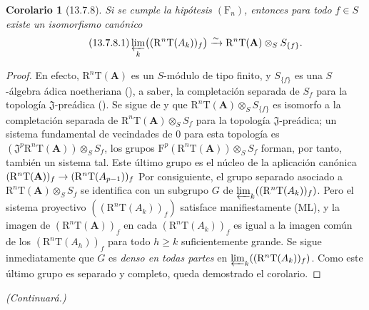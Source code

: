 \documentclass[10pt,oneside,openany]{book}
\theoremstyle{egaenv}\newtheorem*{env}{---}
\theoremstyle{egastatement}
\newtheorem*{corollary}{Corolario}
\theoremstyle{egadescription}
\renewcommand{\geq}{\geqslant}
\renewcommand{\to}{\mathchoice{\longrightarrow}{\rightarrow}{\rightarrow}{\rightarrow}}
\begin{document}
\begin{corollary}[13.7.8]
\label{0.13.7.8}
\label{0.13.7.8-fr}
Si se cumple la hipótesis $(\mathrm F_n)$, entonces para todo $f\in S$
existe un isomorfismo canónico
\begin{equation}
\label{0.13.7.8.1-fr}
\tag{13.7.8.1}
\varprojlim_k\bigl((\mathrm R^n\mathrm T(A_k))_f\bigr)
\xrightarrow{\sim}\mathrm R^n\mathrm T(\mathbf A)\otimes_S S_{\{f\}}.
\end{equation}
\end{corollary}

\begin{proof}
En efecto, $\mathrm R^n\mathrm T(\mathbf A)$ es un $S$-módulo de tipo finito,
y $S_{\{f\}}$ es una $S$-álgebra ádica noetheriana
(), a saber, la completación separada
de $S_f$ para la topología $\mathfrak J$-preádica
().
Se sigue de  y
 que
$\mathrm R^n\mathrm T(\mathbf A)\otimes_S S_{\{f\}}$
es isomorfo a la completación separada de
$\mathrm R^n\mathrm T(\mathbf A)\otimes_S S_f$ para la
topología $\mathfrak J$-preádica; un sistema fundamental de vecindades de $0$ para esta topología es
$(\mathfrak J^p\mathrm R^n\mathrm T(\mathbf A))\otimes_S S_f$,
los grupos
$\mathrm F^p(\mathrm R^n\mathrm T(\mathbf A))\otimes_S S_f$
forman, por tanto, también un sistema tal.
Este último grupo es el núcleo de la aplicación canónica
$(\mathrm R^n\mathrm T(\mathbf A))_f\to
(\mathrm R^n\mathrm T(A_{p-1}))_f$
Por consiguiente, el grupo separado asociado a
$\mathrm R^n\mathrm T(\mathbf A)\otimes_S S_f$ se identifica con un subgrupo
$G$ de
$\varprojlim_k((\mathrm R^n\mathrm T(A_k))_f)$.
Pero el sistema proyectivo
$((\mathrm R^n\mathrm T(A_k))_f)$ satisface manifiestamente {\rm(ML)}, y la
imagen de $(\mathrm R^n\mathrm T(\mathbf A))_f$ en cada
$(\mathrm R^n\mathrm T(A_k))_f$ es igual a la imagen común de los
$(\mathrm R^n\mathrm T(A_h))_f$ para todo $h\geq k$ suficientemente grande.
Se sigue inmediatamente que $G$ es \emph{denso en todas partes} en
$\varprojlim_k((\mathrm R^n\mathrm T(A_k))_f)$.
Como este último grupo es separado y completo, queda demostrado el
corolario.
\end{proof}


\begin{flushright}
\textit{(Continuará.)}
\end{flushright}
\end{document}
